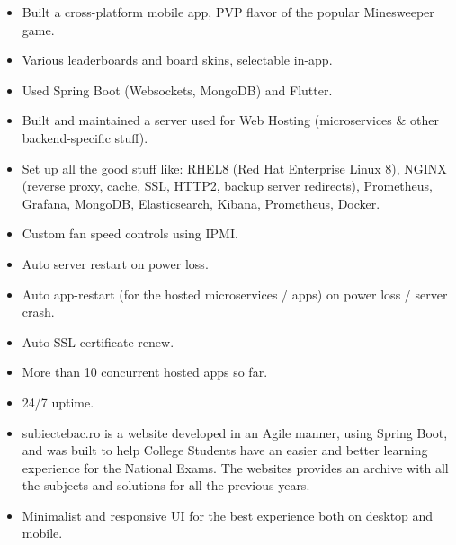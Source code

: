 \documentclass[10pt,a4paper,ragged2e]{resume}
\begin{document}
    \smallskip
    \smallskip
    \smallskip
    \smallskip
    \smallskip

    \begin{fullwidth}
        \begin{itemize}
            \item Built a cross-platform mobile app, PVP flavor of the popular Minesweeper game.
            \item Various leaderboards and board skins, selectable in-app.
            \item Used Spring Boot (Websockets, MongoDB) and Flutter.
        \end{itemize}
        \divider

        \begin{itemize}
            \item Built and maintained a server used for Web Hosting (microservices \& other backend-specific stuff).
            \item Set up all the good stuff like: RHEL8 (Red Hat Enterprise Linux 8), NGINX (reverse proxy, cache, SSL, HTTP2, backup server redirects), Prometheus, Grafana, MongoDB, Elasticsearch, Kibana, Prometheus, Docker.
            \item Custom fan speed controls using IPMI.
            \item Auto server restart on power loss.
            \item Auto app-restart (for the hosted microservices / apps) on power loss / server crash.
            \item Auto SSL certificate renew.
            \item More than 10 concurrent hosted apps so far.
            \item 24/7 uptime.
        \end{itemize}
        \divider

        \begin{itemize}
            \item subiectebac.ro is a website developed in an Agile manner, using Spring Boot, and was built to help College Students have an easier and better learning experience for the National Exams.
            \itme The websites provides an archive with all the subjects and solutions for all the previous years.
            \item Minimalist and responsive UI for the best experience both on desktop and mobile.
        \end{itemize}
        \divider


\end{fullwidth}
\end{document}

